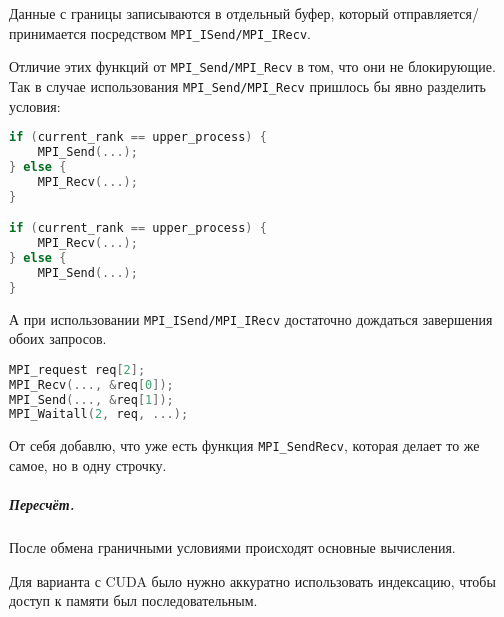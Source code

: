\documentclass[12pt]{article}
\begin{document}
Данные с границы записываются в отдельный буфер, который отправляется/принимается посредством \lstinline{MPI_ISend/MPI_IRecv}.

Отличие этих функций от \lstinline{MPI_Send/MPI_Recv} в том, что они не блокирующие.
Так в случае использования \lstinline{MPI_Send/MPI_Recv} пришлось бы явно разделить условия:

\begin{lstlisting}[language=c++]
if (current_rank == upper_process) {
    MPI_Send(...);
} else {
    MPI_Recv(...);
}

if (current_rank == upper_process) {
    MPI_Recv(...);
} else {
    MPI_Send(...);
}
\end{lstlisting}

А при использовании \lstinline{MPI_ISend/MPI_IRecv} достаточно дождаться завершения обоих запросов.
\begin{lstlisting}[language=c++]
MPI_request req[2];
MPI_Recv(..., &req[0]);
MPI_Send(..., &req[1]);
MPI_Waitall(2, req, ...);
\end{lstlisting}

От себя добавлю, что уже есть функция \lstinline{MPI_SendRecv}, которая делает то же самое, но в одну строчку.

\subparagraph*{Пересчёт.}

После обмена граничными условиями происходят основные вычисления.

Для варианта с CUDA было нужно аккуратно использовать индексацию, чтобы доступ к памяти был последовательным.
\end{document}
